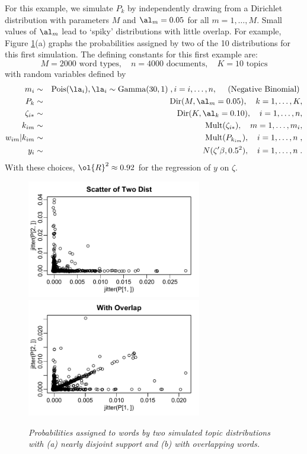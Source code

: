 \documentclass[12pt]{article}
\begin{document}
  
 For this example, we simulate $P_k$ by independently drawing from a Dirichlet distribution with parameters $M$ and $\al_m = 0.05$ for all $m = 1,\ldots,M$.  Small values of $\al_m$ lead to `spiky' distributions with little overlap.  For example, Figure \ref{fig:simdist}(a) graphs the probabilities assigned by two of the 10 distributions for this first simulation.  The defining constants for this first example are:
 \begin{displaymath}
    M = 2000 \mbox{ word types}, \quad
    n = 4000 \mbox{ documents},  \quad
    K = 10 \mbox{ topics}   
 \end{displaymath}
 with random variables defined by
 \begin{eqnarray*}
    m_i           &\sim& \mbox{Pois}(\la_i), \la_i \sim \mbox{Gamma}(30,1)\;,
                     i = i,\ldots, n, \quad \mbox{ (Negative Binomial) }       \cr
    P_k                &\sim& \mbox{Dir}(M, \al_m=0.05), \quad k=1,\ldots,K,  \cr
    \zeta_{i*}        &\sim& \mbox{Dir}(K, \al_k=0.10),\quad i=1,\ldots,n,  \cr
    k_{im}             &\sim& \mbox{Mult}(\zeta_{i*}), \quad m=1,\ldots,m_i,    \cr 
    w_{im}|k_{im} &\sim& \mbox{Mult}(P_{k_{im}}), \quad i=1,\ldots,n \;, \cr
    y_i                  &\sim& N(\zeta'\beta, 0.5^2), \quad i = 1,\ldots,n \;.
 \end{eqnarray*}
 With these choices, $\ol{R}^2 \approx 0.92$ for the regression of $y$ on $\zeta$.

 
\begin{figure}
 \caption{ \label{fig:simdist}
  \sl Probabilities assigned to words by two simulated topic distributions with (a) nearly disjoint support and (b) with overlapping words.}  
  \centerline{   
     \includegraphics[width=3in]{figures/simdist}    
     \includegraphics[width=3in]{figures/simdistB}    }
\end{figure}
\end{document}
